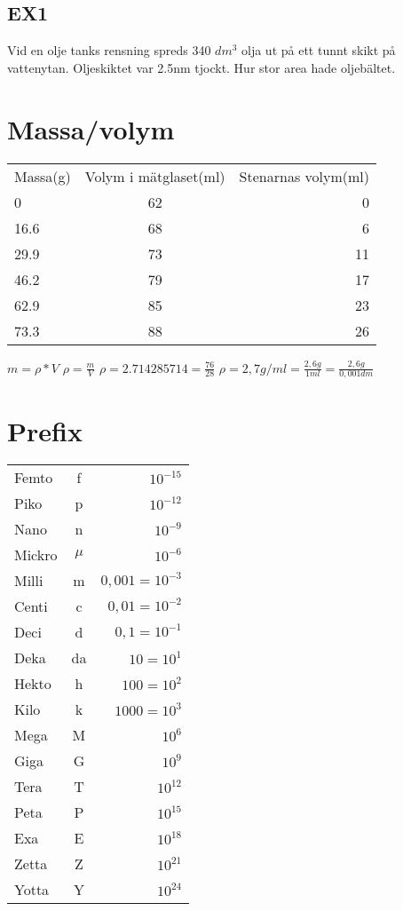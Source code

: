 \documentclass[a4paper,11pt]{article}
\begin{document}
\begin{flushleft}
\subsection{EX1} Vid en olje tanks rensning spreds 340 $ dm^3 $ olja ut på ett tunnt skikt på vattenytan.
Oljeskiktet var 2.5nm tjockt.\newline
Hur stor area hade oljebältet.
\newline

\section{Massa/volym}

\begin{tabular}{l c r}
  Massa(g) & Volym i mätglaset(ml) & Stenarnas volym(ml)\\
  0 & 62 & 0\\
  16.6 & 68 & 6\\
  29.9 & 73 & 11\\
  46.2 & 79 & 17\\
  62.9 & 85 & 23\\
  73.3 & 88 & 26\\
\end{tabular}
\newline
\newline
$ m = \rho * V  $
\newline
$ \rho = \frac{m}{V} $
\newline
$ \rho = 2.714285714 = \frac{76}{28} $\newline
$ \rho = 2,7 g/ml = \frac{2,6 g}{1 ml} = \frac{2,6 g}{0,001 dm} $
\newpage
\section{Prefix}

\begin{tabular}{l c r}
  Femto & f & $ 10^{-15} $\\ 
  Piko & p & $ 10^{-12} $\\ 
  Nano & n & $ 10^{-9} $\\ 
  Mickro & $ \mu $ & $ 10^{-6} $\\ 
  Milli & m & $ 0,001 = 10^{-3} $\\
  Centi & c & $ 0,01 = 10^{-2} $\\
  Deci & d & $ 0,1 = 10^{-1}$\\
  Deka & da & $ 10 = 10^1 $\\
  Hekto & h & $ 100 = 10^2 $\\
  Kilo & k & $ 1000 = 10^3 $\\
  Mega & M & $ 10^6 $\\
  Giga & G & $ 10^9 $\\
  Tera & T & $ 10^{12} $\\
  Peta & P & $ 10^{15} $\\
  Exa & E & $ 10^{18} $\\
  Zetta & Z & $ 10^{21} $\\
  Yotta & Y & $ 10^{24} $\\
\end{tabular}
\newpage

\end{flushleft}
\end{document}
